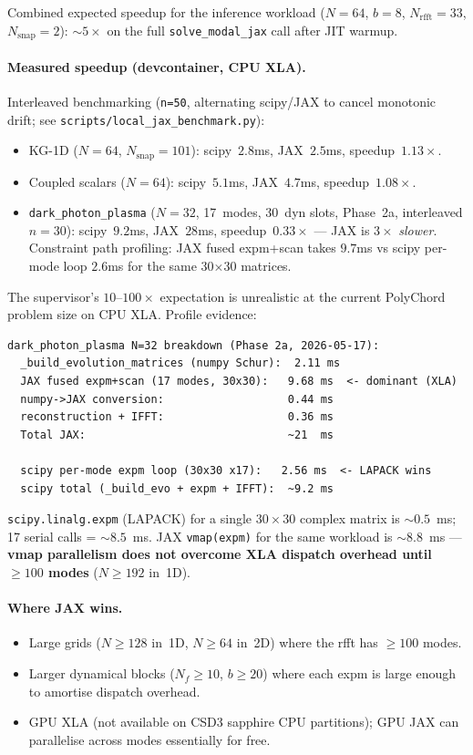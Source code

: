Combined expected speedup for the inference workload ($N=64$, $b=8$,
$N_{\mathrm{rfft}}=33$, $N_{\mathrm{snap}}=2$): $\sim5\times$ on the full
\texttt{solve\_modal\_jax} call after JIT warmup.

\paragraph{Measured speedup (devcontainer, CPU XLA).}
Interleaved benchmarking (\texttt{n=50}, alternating scipy/JAX to cancel
monotonic drift; see \texttt{scripts/local\_jax\_benchmark.py}):

\begin{itemize}
  \item KG-1D ($N=64$, $N_{\mathrm{snap}}=101$): scipy~$2.8$ms,
    JAX~$2.5$ms, speedup~$1.13\times$.
  \item Coupled scalars ($N=64$): scipy~$5.1$ms, JAX~$4.7$ms,
    speedup~$1.08\times$.
  \item \texttt{dark\_photon\_plasma} ($N=32$, 17~modes, 30~dyn slots,
    Phase~2a, interleaved $n=30$): scipy~$9.2$ms, JAX~$28$ms,
    speedup~$\mathbf{0.33\times}$ — JAX is $3\times$ \emph{slower}.
    Constraint path profiling: JAX fused expm+scan takes $9.7$ms
    vs scipy per-mode loop $2.6$ms for the same 30$\times$30 matrices.
\end{itemize}

The supervisor's $10$--$100\times$ expectation is unrealistic at the
current PolyChord problem size on CPU XLA. Profile evidence:

\begin{verbatim}
dark_photon_plasma N=32 breakdown (Phase 2a, 2026-05-17):
  _build_evolution_matrices (numpy Schur):  2.11 ms
  JAX fused expm+scan (17 modes, 30x30):   9.68 ms  <- dominant (XLA)
  numpy->JAX conversion:                   0.44 ms
  reconstruction + IFFT:                   0.36 ms
  Total JAX:                               ~21  ms

  scipy per-mode expm loop (30x30 x17):   2.56 ms  <- LAPACK wins
  scipy total (_build_evo + expm + IFFT):  ~9.2 ms
\end{verbatim}

\texttt{scipy.linalg.expm} (LAPACK) for a single $30\times30$ complex
matrix is $\sim0.5$~ms; 17 serial calls = $\sim8.5$~ms.  JAX
\texttt{vmap(expm)} for the same workload is $\sim8.8$~ms ---
\textbf{vmap parallelism does not overcome XLA dispatch overhead until
$\geq100$ modes} ($N\geq192$ in~1D).

\paragraph{Where JAX wins.}
\begin{itemize}
  \item Large grids ($N\geq128$ in~1D, $N\geq64$ in~2D) where the rfft
    has $\geq100$ modes.
  \item Larger dynamical blocks ($N_f \geq 10$, $b \geq 20$) where each
    expm is large enough to amortise dispatch overhead.
  \item GPU XLA (not available on CSD3 sapphire CPU partitions); GPU
    JAX can parallelise across modes essentially for free.
\end{itemize}

